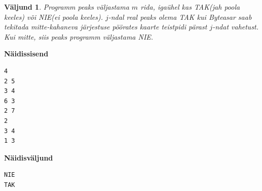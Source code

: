 \documentclass{trkut}
\newtheorem*{Output}{Väljund}
\begin{document}
\begin{Output}
Programm peaks väljastama $m$ rida, igaühel kas TAK(jah poola keeles) või NIE(ei poola keeles). 
$j$-ndal real peaks olema TAK kui Byteasar saab tekitada mitte-kahaneva järjestuse pöörates kaarte teistpidi pärast $j$-ndat vahetust. Kui mitte, siis peaks programm väljastama NIE.
\end{Output}



\textbf{Näidissisend}

\begin{verbatim}
4
2 5
3 4
6 3
2 7
2
3 4
1 3
\end{verbatim}

\textbf{Näidisväljund}

\begin{verbatim}
NIE
TAK
\end{verbatim}
\end{document}
